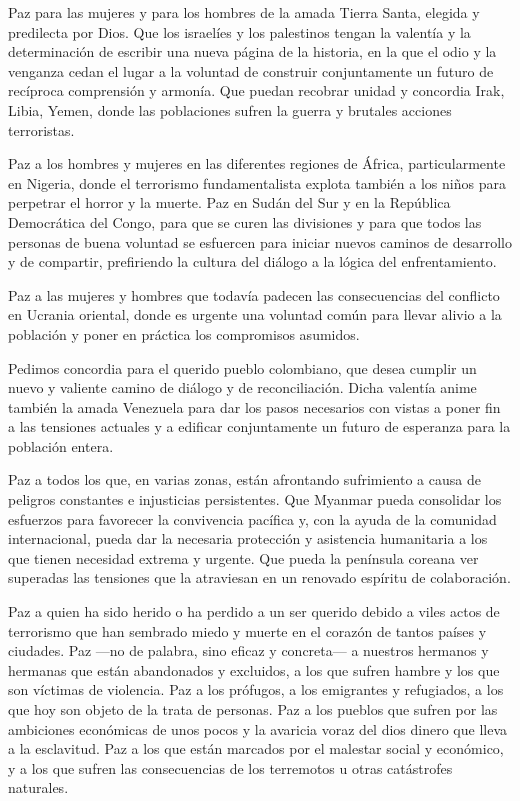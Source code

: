 \begin{body}
	Paz para las mujeres y para los hombres de la amada Tierra Santa, elegida y predilecta por Dios. Que los israelíes y los palestinos tengan la valentía y la determinación de escribir una nueva página de la historia, en la que el odio y la venganza cedan el lugar a la voluntad de construir conjuntamente un futuro de recíproca comprensión y armonía. Que puedan recobrar unidad y concordia Irak, Libia, Yemen, donde las poblaciones sufren la guerra y brutales acciones terroristas.
	
	Paz a los hombres y mujeres en las diferentes regiones de África, particularmente en Nigeria, donde el terrorismo fundamentalista explota también a los niños para perpetrar el horror y la muerte. Paz en Sudán del Sur y en la República Democrática del Congo, para que se curen las divisiones y para que todos las personas de buena voluntad se esfuercen para iniciar nuevos caminos de desarrollo y de compartir, prefiriendo la cultura del diálogo a la lógica del enfrentamiento.
	
	Paz a las mujeres y hombres que todavía padecen las consecuencias del conflicto en Ucrania oriental, donde es urgente una voluntad común para llevar alivio a la población y poner en práctica los compromisos asumidos.
	
	Pedimos concordia para el querido pueblo colombiano, que desea cumplir un nuevo y valiente camino de diálogo y de reconciliación. Dicha valentía anime también la amada Venezuela para dar los pasos necesarios con vistas a poner fin a las tensiones actuales y a edificar conjuntamente un futuro de esperanza para la población entera.
	
	Paz a todos los que, en varias zonas, están afrontando sufrimiento a causa de peligros constantes e injusticias persistentes. Que Myanmar pueda consolidar los esfuerzos para favorecer la convivencia pacífica y, con la ayuda de la comunidad internacional, pueda dar la necesaria protección y asistencia humanitaria a los que tienen necesidad extrema y urgente. Que pueda la península coreana ver superadas las tensiones que la atraviesan en un renovado espíritu de colaboración.
	
	Paz a quien ha sido herido o ha perdido a un ser querido debido a viles actos de terrorismo que han sembrado miedo y muerte en el corazón de tantos países y ciudades. Paz ---no de palabra, sino eficaz y concreta--- a nuestros hermanos y hermanas que están abandonados y excluidos, a los que sufren hambre y los que son víctimas de violencia. Paz a los prófugos, a los emigrantes y refugiados, a los que hoy son objeto de la trata de personas. Paz a los pueblos que sufren por las ambiciones económicas de unos pocos y la avaricia voraz del dios dinero que lleva a la esclavitud. Paz a los que están marcados por el malestar social y económico, y a los que sufren las consecuencias de los terremotos u otras catástrofes naturales.
	

\end{body}
